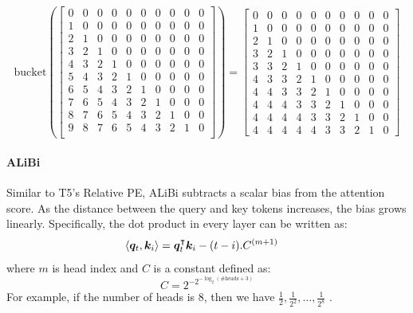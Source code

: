 \documentclass{article}
\begin{document}
\[
  \mathrm{bucket}(
  \begin{bmatrix}
    0 & 0 & 0 & 0 & 0 & 0 & 0 & 0 & 0 & 0 \\
    1 & 0 & 0 & 0 & 0 & 0 & 0 & 0 & 0 & 0 \\
    2 & 1 & 0 & 0 & 0 & 0 & 0 & 0 & 0 & 0 \\
    3 & 2 & 1 & 0 & 0 & 0 & 0 & 0 & 0 & 0 \\
    4 & 3 & 2 & 1 & 0 & 0 & 0 & 0 & 0 & 0 \\
    5 & 4 & 3 & 2 & 1 & 0 & 0 & 0 & 0 & 0 \\
    6 & 5 & 4 & 3 & 2 & 1 & 0 & 0 & 0 & 0 \\
    7 & 6 & 5 & 4 & 3 & 2 & 1 & 0 & 0 & 0 \\
    8 & 7 & 6 & 5 & 4 & 3 & 2 & 1 & 0 & 0 \\
    9 & 8 & 7 & 6 & 5 & 4 & 3 & 2 & 1 & 0 \\
  \end{bmatrix}
  )
  =
  \begin{bmatrix}
    0 & 0 & 0 & 0 & 0 & 0 & 0 & 0 & 0 & 0 \\
    1 & 0 & 0 & 0 & 0 & 0 & 0 & 0 & 0 & 0 \\
    2 & 1 & 0 & 0 & 0 & 0 & 0 & 0 & 0 & 0 \\
    3 & 2 & 1 & 0 & 0 & 0 & 0 & 0 & 0 & 0 \\
    3 & 3 & 2 & 1 & 0 & 0 & 0 & 0 & 0 & 0 \\
    4 & 3 & 3 & 2 & 1 & 0 & 0 & 0 & 0 & 0 \\
    4 & 4 & 3 & 3 & 2 & 1 & 0 & 0 & 0 & 0 \\
    4 & 4 & 4 & 3 & 3 & 2 & 1 & 0 & 0 & 0 \\
    4 & 4 & 4 & 4 & 3 & 3 & 2 & 1 & 0 & 0 \\
    4 & 4 & 4 & 4 & 4 & 3 & 3 & 2 & 1 & 0
  \end{bmatrix}
\]


\paragraph{ALiBi}
Similar to T5's Relative PE, ALiBi subtracts a scalar bias from the attention score. As the distance between the query and key tokens increases, the bias grows linearly. Specifically, the dot product in every layer can be written as:
\begin{align}
  \label{eq:alibi}
  \langle {\bm{q}}_t, {\bm{k}}_i \rangle & = {\bm{q}}_t^\intercal {\bm{k}}_i - (t-i).C^{(m+1)}
\end{align}
where $m$ is head index and $C$ is a constant defined as:
$$
  C = 2^{-2^{-\log _2 (\text{\# heads}+3)}}
$$
For example, if the number of heads is 8, then we have $\frac{1}{2}, \frac{1}{2^2}, \dots, \frac{1}{2^8}$ \citep{Press2022:ALiBi}.
\end{document}
